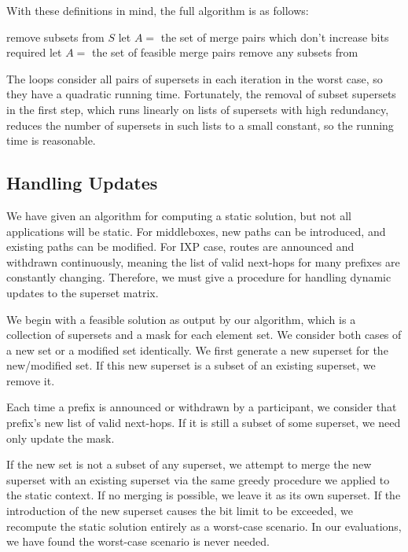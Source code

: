 With these definitions in mind, the full algorithm is as follows:

\begin{algorithm}
remove subsets from $S$\;
let $A =$ the set of merge pairs which don't increase bits required\;
let $A =$ the set of feasible merge pairs\;
remove any subsets from
\end{algorithm}

The loops consider all pairs of supersets in each iteration in the worst case, so they have a quadratic running time. Fortunately, the removal of subset supersets in the first step, which runs linearly on lists of supersets with high redundancy, reduces the number of supersets in such lists to a small constant, so the running time is reasonable.

\subsection{Handling Updates}

We have given an algorithm for computing a static solution, but not all applications will be static. For middleboxes, new paths can be introduced, and existing paths can be modified. For IXP case, routes are announced and withdrawn continuously, meaning the list of valid next-hops for many prefixes are constantly changing. Therefore, we must give a procedure for handling dynamic updates to the superset matrix.

We begin with a feasible solution as output by our algorithm, which is a collection of supersets and a mask for each element set. We consider both cases of a new set or a modified set identically. We first generate a new superset for the new/modified set. If this new superset is a subset of an existing superset, we remove it. 

Each time a prefix is announced or withdrawn by a participant, we consider that prefix's new list of valid next-hops. If it is still a subset of some superset, we need only update the mask. 

If the new set is not a subset of any superset, we attempt to merge the new superset with an existing superset via the same greedy procedure we applied to the static context. If no merging is possible, we leave it as its own superset. If the introduction of the new superset causes the bit limit to be exceeded, we recompute the static solution entirely as a worst-case scenario. In our evaluations, we have found the worst-case scenario is never needed.



